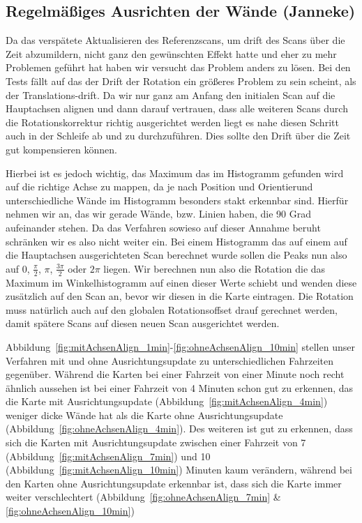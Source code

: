 \subsection{Regelmäßiges Ausrichten der Wände (Janneke)}

Da das verspätete Aktualisieren des Referenzscans, um drift des Scans über die Zeit abzumildern, nicht ganz den gewünschten Effekt hatte und eher zu mehr Problemen geführt hat haben wir versucht das Problem anders zu lösen. Bei den Tests fällt auf das der Drift der Rotation ein größeres Problem zu sein scheint, als der Translations-drift. Da wir nur ganz am Anfang den initialen Scan auf die Hauptachsen alignen und dann darauf vertrauen, dass alle weiteren Scans durch die Rotationskorrektur richtig ausgerichtet werden liegt es nahe diesen Schritt auch in der Schleife ab und zu durchzuführen. Dies sollte den Drift über die Zeit gut kompensieren können.

Hierbei ist es jedoch wichtig, das Maximum das im Histogramm gefunden wird auf die richtige Achse zu mappen, da je nach Position und Orientierund unterschiedliche Wände im Histogramm besonders stakt erkennbar sind. Hierfür nehmen wir an, das wir gerade Wände, bzw. Linien haben, die 90 Grad aufeinander stehen. Da das Verfahren sowieso auf dieser Annahme beruht schränken wir es also nicht weiter ein. Bei einem Histogramm das auf einem auf die Hauptachsen ausgerichteten Scan berechnet wurde sollen die Peaks nun also auf 0, $\frac{\pi}{2}$, $\pi$, $\frac{3\pi}{2}$ oder $2\pi$ liegen. Wir berechnen nun also die Rotation die das Maximum im Winkelhistogramm auf einen dieser Werte schiebt und wenden diese zusätzlich auf den Scan an, bevor wir diesen in die Karte eintragen. Die Rotation muss natürlich auch auf den globalen Rotationsoffset drauf gerechnet werden, damit spätere Scans auf diesen neuen Scan ausgerichtet werden.

Abbildung~\ref{fig:mitAchsenAlign_1min}-\ref{fig:ohneAchsenAlign_10min} stellen unser Verfahren mit und ohne Ausrichtungsupdate zu unterschiedlichen Fahrzeiten gegenüber. Während die Karten bei einer Fahrzeit von einer Minute noch recht ähnlich aussehen ist bei einer Fahrzeit von 4 Minuten schon gut zu erkennen, das die Karte mit Ausrichtungsupdate (Abbildung~\ref{fig:mitAchsenAlign_4min}) weniger dicke Wände hat als die Karte ohne Ausrichtungsupdate (Abbildung~\ref{fig:ohneAchsenAlign_4min}). Des weiteren ist gut zu erkennen, dass sich die Karten mit Ausrichtungsupdate zwischen einer Fahrzeit von 7 (Abbildung~\ref{fig:mitAchsenAlign_7min}) und 10 (Abbildung~\ref{fig:mitAchsenAlign_10min}) Minuten kaum verändern, während bei den Karten ohne Ausrichtungsupdate erkennbar ist, dass sich die Karte immer weiter verschlechtert (Abbildung~\ref{fig:ohneAchsenAlign_7min} \& \ref{fig:ohneAchsenAlign_10min})  

